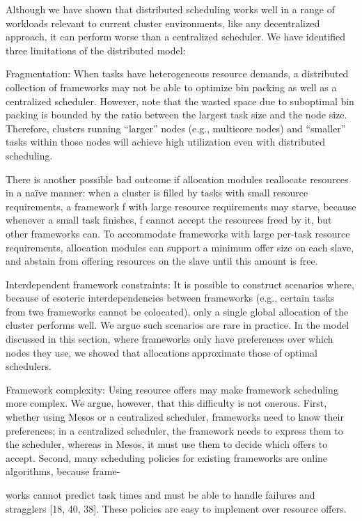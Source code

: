 \documentclass[
]{article}
\begin{document}
Although we have shown that distributed scheduling works well in a range
of workloads relevant to current cluster environments, like any
decentralized approach, it can perform worse than a centralized
scheduler. We have identified three limitations of the distributed
model:

Fragmentation: When tasks have heterogeneous resource demands, a
distributed collection of frameworks may not be able to optimize bin
packing as well as a centralized scheduler. However, note that the
wasted space due to suboptimal bin packing is bounded by the ratio
between the largest task size and the node size. Therefore, clusters
running ``larger'' nodes (e.g., multicore nodes) and ``smaller'' tasks
within those nodes will achieve high utilization even with distributed
scheduling.

There is another possible bad outcome if allocation modules reallocate
resources in a naïve manner: when a cluster is filled by tasks with
small resource requirements, a framework f with large resource
requirements may starve, because whenever a small task finishes, f
cannot accept the resources freed by it, but other frameworks can. To
accommodate frameworks with large per-task resource requirements,
allocation modules can support a minimum offer size on each slave, and
abstain from offering resources on the slave until this amount is free.

Interdependent framework constraints: It is possible to construct
scenarios where, because of esoteric interdependencies between
frameworks (e.g., certain tasks from two frameworks cannot be
colocated), only a single global allocation of the cluster performs
well. We argue such scenarios are rare in practice. In the model
discussed in this section, where frameworks only have preferences over
which nodes they use, we showed that allocations approximate those of
optimal schedulers.

Framework complexity: Using resource offers may make framework
scheduling more complex. We argue, however, that this difficulty is not
onerous. First, whether using Mesos or a centralized scheduler,
frameworks need to know their preferences; in a centralized scheduler,
the framework needs to express them to the scheduler, whereas in Mesos,
it must use them to decide which offers to accept. Second, many
scheduling policies for existing frameworks are online algorithms,
because frame-

works cannot predict task times and must be able to handle failures and
stragglers {[}18, 40, 38{]}. These policies are easy to implement over
resource offers.
\end{document}
